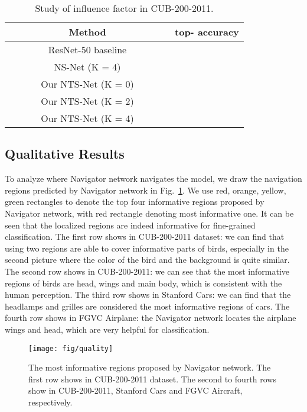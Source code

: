 \documentclass[runningheads]{llncs}
\begin{document}
\begin{table}[ht]
	\begin{center}
	\begin{tabular}{|c|c|}
	\hline
	Method & top- accuracy \\
	\hline\hline
	ResNet-50 baseline &  \\
	\hline
	NS-Net (K = 4) &  \\
	\hline
	Our NTS-Net (K = 0) & \\
	\hline
	Our NTS-Net (K = 2) & \\
	\hline
	~~~~~~ Our NTS-Net (K = 4) ~~~~~~ & \\
	\hline
	\end{tabular}
	\end{center}
\caption{Study of influence factor in CUB-200-2011.}
\label{factor}
\end{table}
\subsection{Qualitative Results}
To analyze where Navigator network navigates the model, we draw the navigation regions predicted by Navigator network in Fig.~\ref{quality}. We use red, orange, yellow, green rectangles to denote the top four informative regions proposed by Navigator network, with red rectangle denoting most informative one. It can be seen that the localized regions are indeed informative for fine-grained classification. The first row shows  in CUB-200-2011 dataset: we can find that using two regions are able to cover informative parts of birds, especially in the second picture where the color of the bird and the background is quite similar. The second row shows  in CUB-200-2011: we can see that the most informative regions of birds are head, wings and main body, which is consistent with the human perception. The third row shows  in Stanford Cars: we can find that the headlamps and grilles are considered the most informative regions of cars. The fourth row shows  in FGVC Airplane: the Navigator network locates the airplane wings and head, which are very helpful for classification. 

\begin{figure}[ht]
\begin{center}
\texttt{[image: fig/quality]}
\end{center}
   \caption{The most informative regions proposed by Navigator network. The first row shows  in CUB-200-2011 dataset. The second to fourth rows show  in CUB-200-2011, Stanford Cars and FGVC Aircraft, respectively.}
\label{quality}
\end{figure}
\end{document}
